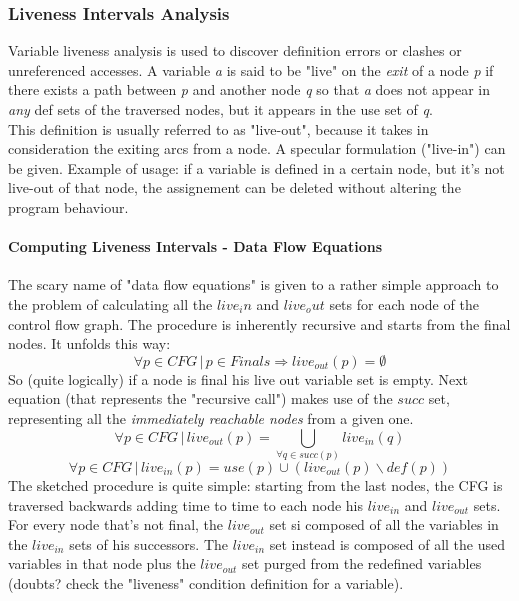                 \subsubsection{Liveness Intervals Analysis}
                    Variable liveness analysis is used to discover definition errors or clashes or unreferenced accesses. A variable \emph{a} is said to be "live" on the \emph{exit} of a node \emph{p} if there exists a path between \emph{p} and another node \emph{q} so that \emph{a} does not appear in \emph{any} def sets of the traversed nodes, but it appears in the use set of \emph{q}.\\
                    This definition is usually referred to as "live-out", because it takes in consideration the exiting arcs from a node. A specular formulation ("live-in") can be given. Example of usage: if a variable is defined in a certain node, but it's not live-out of that node, the assignement can be deleted without altering the program behaviour.
                    
                    \paragraph{Computing Liveness Intervals - Data Flow Equations}
                        The scary name of "data flow equations" is given to a rather simple approach to the problem of calculating all the $live_in$ and $live_out$ sets for each node of the control flow graph. The procedure is inherently recursive and starts from the final nodes. It unfolds this way:
                        \begin{equation}
                            \forall p \in CFG \,\vert\, p \in Finals \Rightarrow live_{out}(p) = \emptyset
                        \end{equation}
                        So (quite logically) if a node is final his live out variable set is empty. Next equation (that represents the "recursive call") makes use of the $succ$ set, representing all the \emph{immediately reachable nodes} from a given one.
                        \begin{equation}
                            \forall p \in CFG \,\vert\, live_{out}(p) = \bigcup\limits_{\forall q \in succ(p)} live_{in}(q) 
                        \end{equation}
                        \begin{equation}
                            \forall p \in CFG \,\vert\, live_{in}(p) = use(p) \cup (live_{out}(p) \backslash def(p))
                        \end{equation}
                        The sketched procedure is quite simple: starting from the last nodes, the CFG is traversed backwards adding time to time to each node his $live_{in}$ and $live_{out}$ sets. For every node that's not final, the $live_{out}$ set si composed of all the variables in the $live_{in}$ sets of his successors. The $live_{in}$ set instead is composed of all the used variables in that node plus the $live_{out}$ set purged from the redefined variables (doubts? check the "liveness" condition definition for a variable).
                        
